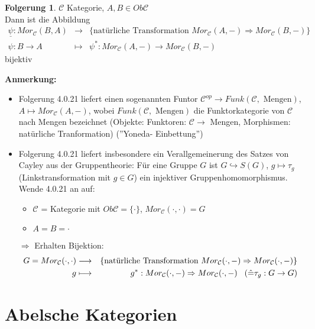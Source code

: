 \documentclass[10pt,a4paper,numbers=endperiod]{scrreprt}
\theoremstyle{definition}
\newtheorem{folg}[satz]{Folgerung}
\begin{document}
\begin{folg}
	$\mathcal{C}$ Kategorie, $A, B \in Ob \mathcal{C}$\\
	Dann ist die Abbildung \begin{eqnarray*}
		\underline{\psi}: Mor_\mathcal{C} (B, A) &\longrightarrow& \{\text{natürliche Transformation } Mor_\mathcal{C} (A, -) \Rightarrow Mor_\mathcal{C} (B, -)\}\\
		\psi: B \to A &\longmapsto& \psi^*: Mor_\mathcal{C} (A, -) \to Mor_\mathcal{C} (B,-)
	\end{eqnarray*}
	bijektiv
\end{folg}

\textbf{Anmerkung:} \begin{itemize}
	\item Folgerung 4.0.21 liefert einen sogenannten Funtor $\mathcal{C}^{op} \longrightarrow Funk(\mathcal{C}, \text{ Mengen})$, $A \mapsto Mor_\mathcal{C} (A,-)$, wobei $Funk(\mathcal{C}, \text{ Mengen})$ die Funktorkategorie von $\mathcal{C}$ nach Mengen bezeichnet (Objekte: Funktoren: $\mathcal{C} \rightarrow $ Mengen, Morphismen: natürliche Tranformation) (''Yoneda- Einbettung'')
	\item Folgerung 4.0.21 liefert insbesondere ein Verallgemeinerung des Satzes von Cayley aus der Gruppentheorie: Für eine Gruppe $G$ ist $G \hookrightarrow S(G)$, $g \mapsto \tau_g$ (Linkstransformation mit $g \in G$) ein injektiver Gruppenhomomorphismus.\\
	Wende 4.0.21 an auf: \begin{itemize}
		\item $\mathcal{C}$ = Kategorie mit $Ob \mathcal{C} = \{ \cdot\}$, $Mor_\mathcal{C} ( \cdot, \cdot ) = G$
		\item $A = B = \cdot$
		\end{itemize}
	$\Rightarrow$ Erhalten Bijektion: \begin{eqnarray*}
	 	G = Mor_\mathcal{C}(\cdot, \cdot) &\longrightarrow& \{\text{natürliche Transformation } Mor_\mathcal{C}(\cdot, -) \Rightarrow Mor_\mathcal{C} (\cdot, -)\}\\
	 	g &\longmapsto& g^*: Mor_\mathcal{C} (\cdot, -) \Rightarrow Mor_\mathcal{C} (\cdot, -) \hspace*{3mm} (\hat{=} \tau_g: G \to G) 
	\end{eqnarray*}
\end{itemize}

\chapter{Abelsche Kategorien} 
\end{document}
